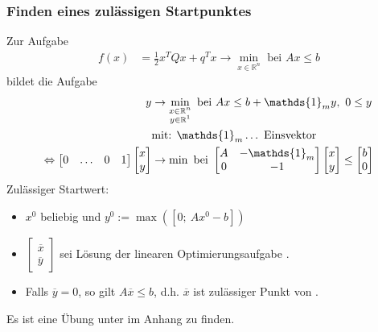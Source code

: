 \subsubsection{Finden eines zulässigen Startpunktes}
Zur Aufgabe 
\begin{align}
	f(x) & =\frac12 x^TQx+q^Tx\rightarrow\min\limits_{x\in\mathbb{R}^n} \text{ bei } Ax\le b \label{eq:startpkt_1}
\end{align} 
bildet die Aufgabe 
\begin{align}
	y & \rightarrow\min\limits_{\substack{x\in\mathbb{R}^n\\y\in\mathbb{R}^1}} \text{ bei } Ax\le b+\mathds{1}_m y,\ 0\le y \label{eq:startpkt_2}\\
	& \text{mit: } \mathds{1}_m\ldots \text{ Einsvektor} \notag\\
	\Leftrightarrow \begin{bmatrix} 0 & \ldots & 0 & 1 \end{bmatrix}\begin{bmatrix} x\\y \end{bmatrix} & \rightarrow\min  \text{ bei } \begin{bmatrix} A & -\mathds{1}_m\\0 & -1
	\end{bmatrix}\begin{bmatrix} x\\y \end{bmatrix}\le \begin{bmatrix} b\\0 \end{bmatrix} \label{eq:startpkt_3}
\end{align}
Zulässiger Startwert:
\begin{itemize}
  \item[] $x^0$ beliebig und $y^0:=\max\left([0;\ Ax^0-b]\right)$
  \item[] $\begin{bmatrix}\overline{x}\\ \overline{y} \end{bmatrix}$ sei Lösung der linearen Optimierungsaufgabe .
  \item[] Falls $\overline{y}=0$, so gilt 
  $A\overline{x}\le b$, d.h. $\overline{x}$ ist zulässiger Punkt von .
\end{itemize}
Es ist eine Übung unter  im Anhang zu finden.


